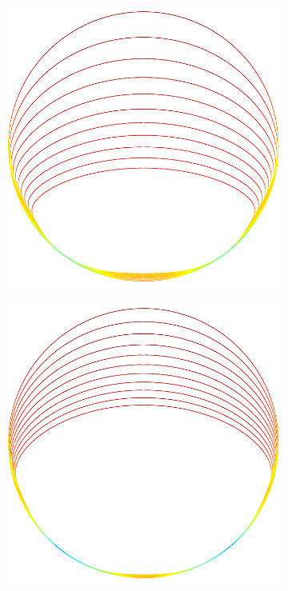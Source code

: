 \documentclass{jfm}
\begin{document}
\begin{figure}
\begin{center}
\begin{subfigure}[b]{0.27\textwidth}
\includegraphics[height = \textwidth]{./figs/1b_0d4r1h_shear}
\caption{}
\end{subfigure}
\begin{subfigure}[b]{0.27\textwidth}
\includegraphics[height = \textwidth]{./figs/1b_0d4r0d5h_shear}

\end{subfigure}
\end{center}
\end{figure}
\end{document}
